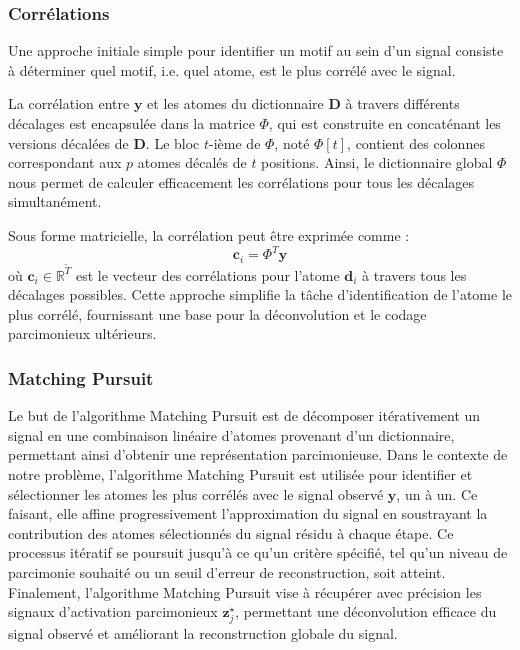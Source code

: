 \documentclass[9pt,a4paper,twoside]{rho}
\begin{document}
\subsubsection{Corrélations}
Une approche initiale simple pour identifier un motif au sein d'un signal consiste à déterminer quel motif, i.e. quel atome, est le plus corrélé avec le signal.

La corrélation entre $\mathbf{y}$ et les atomes du dictionnaire $\mathbf{D}$ à travers différents décalages est encapsulée dans la matrice $\Phi$, qui est construite en concaténant les versions décalées de $\mathbf{D}$. Le bloc $t$-ième de $\Phi$, noté $\Phi[t]$, contient des colonnes correspondant aux $p$ atomes décalés de $t$ positions. Ainsi, le dictionnaire global $\Phi$ nous permet de calculer efficacement les corrélations pour tous les décalages simultanément.

Sous forme matricielle, la corrélation peut être exprimée comme :
\begin{equation}
    \mathbf{c}_i = \Phi^T \mathbf{y}
\end{equation}
où $\mathbf{c}_i \in \mathbb{R}^{\widetilde{T}}$ est le vecteur des corrélations pour l'atome $\mathbf{d}_i$ à travers tous les décalages possibles. Cette approche simplifie la tâche d'identification de l'atome le plus corrélé, fournissant une base pour la déconvolution et le codage parcimonieux ultérieurs.

\subsubsection{Matching Pursuit}
Le but de l'algorithme Matching Pursuit est de décomposer itérativement un signal en une combinaison linéaire d'atomes provenant d'un dictionnaire, permettant ainsi d'obtenir une représentation parcimonieuse. Dans le contexte de notre problème, l'algorithme Matching Pursuit est utilisée pour identifier et sélectionner les atomes les plus corrélés avec le signal observé $\mathbf{y}$, un à un. Ce faisant, elle affine progressivement l'approximation du signal en soustrayant la contribution des atomes sélectionnés du signal résidu à chaque étape. Ce processus itératif se poursuit jusqu'à ce qu'un critère spécifié, tel qu'un niveau de parcimonie souhaité ou un seuil d'erreur de reconstruction, soit atteint. Finalement, l'algorithme Matching Pursuit vise à récupérer avec précision les signaux d'activation parcimonieux $\mathbf{z}_j^{\star}$, permettant une déconvolution efficace du signal observé et améliorant la reconstruction globale du signal.
\end{document}
